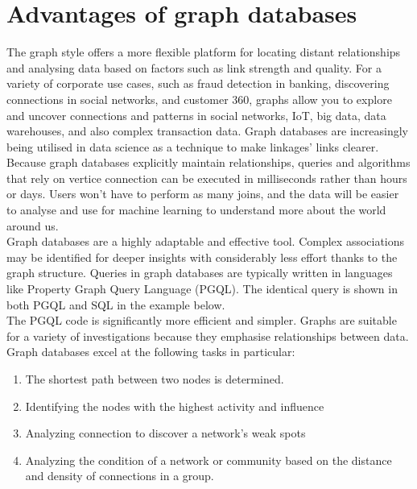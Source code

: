 \documentclass[paper=a4, fontsize=11pt]{scrartcl}
\numberwithin{equation}{section}		%
\numberwithin{figure}{section}			%
\numberwithin{table}{section}				%
\begin{document}
\section{Advantages of graph databases}
The graph style offers a more flexible platform for locating distant relationships and analysing data based on factors such as link strength and quality. For a variety of corporate use cases, such as fraud detection in banking, discovering connections in social networks, and customer 360, graphs allow you to explore and uncover connections and patterns in social networks, IoT, big data, data warehouses, and also complex transaction data. Graph databases are increasingly being utilised in data science as a technique to make linkages' links clearer.
\\
Because graph databases explicitly maintain relationships, queries and algorithms that rely on vertice connection can be executed in milliseconds rather than hours or days. Users won't have to perform as many joins, and the data will be easier to analyse and use for machine learning to understand more about the world around us.
\\
Graph databases are a highly adaptable and effective tool. Complex associations may be identified for deeper insights with considerably less effort thanks to the graph structure. Queries in graph databases are typically written in languages like Property Graph Query Language (PGQL). The identical query is shown in both PGQL and SQL in the example below.
\\
The PGQL code is significantly more efficient and simpler. Graphs are suitable for a variety of investigations because they emphasise relationships between data. Graph databases excel at the following tasks in particular:
\begin{enumerate}
    \item The shortest path between two nodes is determined.
    \item Identifying the nodes with the highest activity and influence
    \item Analyzing connection to discover a network's weak spots
    \item Analyzing the condition of a network or community based on the distance and density of connections in a group.
\end{enumerate}
\newpage
\end{document}

